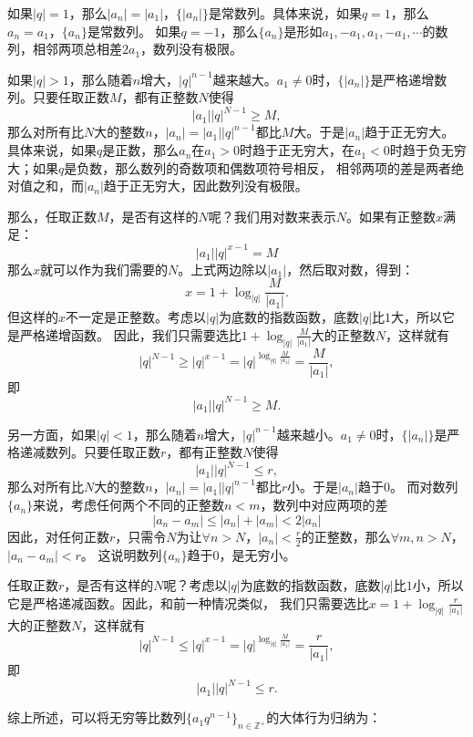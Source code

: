 \documentclass[12pt,UTF8]{ctexbook}
\begin{document}
如果$|q|=1$，那么$|a_n| = |a_1|$，$\{|a_n|\}$是常数列。具体来说，如果$q=1$，那么$a_n = a_1$，$\{a_n\}$是常数列。
如果$q = -1$，那么$\{a_n\}$是形如$a_1, -a_1, a_1, -a_1, \cdots$的数列，相邻两项总相差$2a_1$，数列没有极限。

如果$|q| > 1$，那么随着$n$增大，$|q|^{n-1}$越来越大。$a_1 \neq 0$时，$\{|a_n|\}$是严格递增数列。只要任取正数$M$，都有正整数$N$使得
$$ |a_1||q|^{N-1} \geqslant M,$$
那么对所有比$N$大的整数$n$，$|a_n| = |a_1||q|^{n-1}$都比$M$大。于是$|a_n|$趋于正无穷大。
具体来说，如果$q$是正数，那么$a_n$在$a_1>0$时趋于正无穷大，在$a_1<0$时趋于负无穷大；如果$q$是负数，那么数列的奇数项和偶数项符号相反，
相邻两项的差是两者绝对值之和，而$|a_n|$趋于正无穷大，因此数列没有极限。

那么，任取正数$M$，是否有这样的$N$呢？我们用对数来表示$N$。如果有正整数$x$满足：
$$ |a_1||q|^{x-1} = M $$
那么$x$就可以作为我们需要的$N$。上式两边除以$|a_1|$，然后取对数，得到：
$$ x = 1 + \log_{|q|}{\frac{M}{|a_1|}}. $$
但这样的$x$不一定是正整数。考虑以$|q|$为底数的指数函数，底数$|q|$比$1$大，所以它是严格递增函数。
因此，我们只需要选比$1 + \log_{|q|}{\frac{M}{|a_1|}}$大的正整数$N$，这样就有
$$ |q|^{N-1} \geqslant |q|^{x-1} = |q|^{\log_{|q|}{\frac{M}{|a_1|}}} = \frac{M}{|a_1|},$$
即
$$ |a_1||q|^{N-1} \geqslant M.$$

另一方面，如果$|q| < 1$，那么随着$n$增大，$|q|^{n-1}$越来越小。$a_1 \neq 0$时，$\{|a_n|\}$是严格递减数列。只要任取正数$r$，都有正整数$N$使得
$$ |a_1||q|^{N-1} \leqslant r,$$
那么对所有比$N$大的整数$n$，$|a_n| = |a_1||q|^{n-1}$都比$r$小。于是$|a_n|$趋于$0$。
而对数列$\{a_n\}$来说，考虑任何两个不同的正整数$n<m$，数列中对应两项的差
$$ |a_n - a_m| \leqslant |a_n| + |a_m| < 2|a_n|$$
因此，对任何正数$r$，只需令$N$为让$\forall n > N$，$|a_n| < \frac{r}{2}$的正整数，那么$\forall m, n > N$，$|a_n - a_m| < r$。
这说明数列$\{a_n\}$趋于$0$，是无穷小。

任取正数$r$，是否有这样的$N$呢？考虑以$|q|$为底数的指数函数，底数$|q|$比$1$小，所以它是严格递减函数。因此，和前一种情况类似，
我们只需要选比$x = 1 + \log_{|q|}{\frac{r}{|a_1|}}$大的正整数$N$，这样就有
$$ |q|^{N-1} \leqslant |q|^{x-1} = |q|^{\log_{|q|}{\frac{M}{|a_1|}}} = \frac{r}{|a_1|},$$
即
$$ |a_1||q|^{N-1} \leqslant r.$$

综上所述，可以将无穷等比数列$\{a_1 q^{n-1}\}_{n\in\mathbb{Z}^+}$的大体行为归纳为：

\begin{center}
\end{center}
\end{document}
